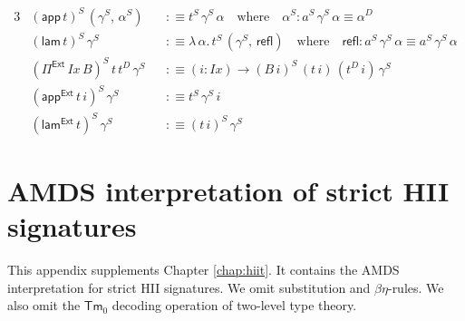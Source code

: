 \documentclass[12pt,a4paper,twoside,openany]{book}
\theoremstyle{remark}
\theoremstyle{definition}
\theoremstyle{theorem}
\newcommand{\mi}[1]{\mathit{#1}}
\newcommand{\ms}[1]{\mathsf{#1}}
\newcommand{\refl}{\mathsf{refl}}
\newcommand{\Tm}{\mathsf{Tm}}
\newcommand{\Pie}{\Pi^{\mathsf{Ext}}}
\newcommand{\appe}{\mathsf{app^{Ext}}}
\newcommand{\lame}{\mathsf{lam^{Ext}}}
\newcommand{\app}{\ms{app}}
\newcommand{\lam}{\ms{lam}}
\newcommand{\defn}{:\equiv}
\begin{document}
\begin{alignat*}{3}
  &(\app\,t)^S\,(\gamma^S,\,\alpha^S) &&\defn t^S\,\gamma^S\,\alpha\hspace{1em}\text{where}\hspace{1em} \alpha^S : a^S\,\gamma^S\,\alpha \equiv \alpha^D\\
  &(\lam\,t)^S\,\gamma^S &&\defn \lambda\,\alpha.\,t^S\,(\gamma^S,\,\refl)\hspace{1em}\text{where}\hspace{1em} \refl : a^S\,\gamma^S\,\alpha \equiv a^S\,\gamma^S\,\alpha\\
  &(\Pie\,\mi{Ix}\,B)^S\,t\,t^D\,\gamma^S &&\defn (i : \mi{Ix}) \to (B\,i)^S\,(t\,i)\,(t^D\,i)\,\gamma^S\\
  &(\appe\,t\,i)^S\,\gamma^S &&\defn t^S\,\gamma^S\,i\\
  &(\lame\,t)^S\,\gamma^S &&\defn (t\,i)^S\,\gamma^S
\end{alignat*}

\chapter{AMDS interpretation of strict HII signatures}
\label{app:hii-amds}

This appendix supplements Chapter \ref{chap:hiit}. It contains the AMDS
interpretation for strict HII signatures. We omit substitution and
$\beta\eta$-rules. We also omit the $\Tm_0$ decoding operation of two-level type
theory.

\pagebreak
\end{document}
